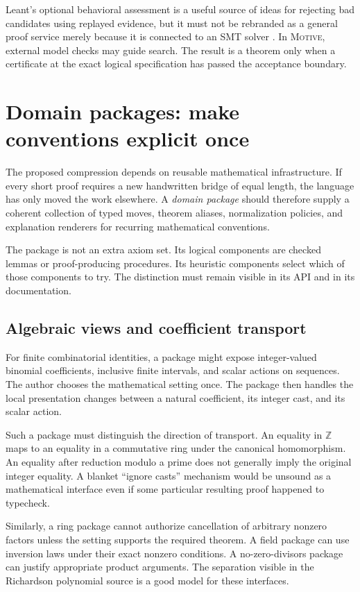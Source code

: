 \documentclass[11pt,a4paper]{article}
\newcommand{\Motive}{\textnormal{\textsc{Motive}}}
\newcommand{\Z}{\mathbb Z}
\theoremstyle{remark}
\begin{document}
Leant's optional behavioral assessment is a useful source of ideas for rejecting bad candidates using replayed evidence, but it must not be rebranded as a general proof service merely because it is connected to an SMT solver \cite{leant-readme}. In \Motive, external model checks may guide search. The result is a theorem only when a certificate at the exact logical specification has passed the acceptance boundary.

\section{Domain packages: make conventions explicit once}
\label{sec:domains}
The proposed compression depends on reusable mathematical infrastructure. If every short proof requires a new handwritten bridge of equal length, the language has only moved the work elsewhere. A \emph{domain package} should therefore supply a coherent collection of typed moves, theorem aliases, normalization policies, and explanation renderers for recurring mathematical conventions.

The package is not an extra axiom set. Its logical components are checked lemmas or proof-producing procedures. Its heuristic components select which of those components to try. The distinction must remain visible in its API and in its documentation.

\subsection{Algebraic views and coefficient transport}
For finite combinatorial identities, a package might expose integer-valued binomial coefficients, inclusive finite intervals, and scalar actions on sequences. The author chooses the mathematical setting once. The package then handles the local presentation changes between a natural coefficient, its integer cast, and its scalar action.

Such a package must distinguish the direction of transport. An equality in $\Z$ maps to an equality in a commutative ring under the canonical homomorphism. An equality after reduction modulo a prime does not generally imply the original integer equality. A blanket ``ignore casts'' mechanism would be unsound as a mathematical interface even if some particular resulting proof happened to typecheck.

Similarly, a ring package cannot authorize cancellation of arbitrary nonzero factors unless the setting supports the required theorem. A field package can use inversion laws under their exact nonzero conditions. A no-zero-divisors package can justify appropriate product arguments. The separation visible in the Richardson polynomial source is a good model for these interfaces.
\end{document}
